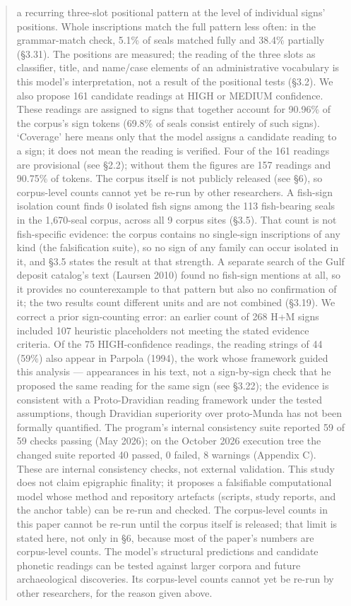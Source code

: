 \documentclass[11pt]{article}
\begin{document}
\begin{abstract}
a recurring three-slot positional pattern at the level of individual signs' positions. Whole inscriptions match the full pattern less often: in the grammar-match check, 5.1\% of seals matched fully and 38.4\% partially (§3.31). The positions are measured; the reading of the three slots as classifier, title, and name/case elements of an administrative vocabulary is this model's interpretation, not a result of the positional tests (§3.2). We also propose 161 candidate readings at HIGH or MEDIUM confidence. These readings are assigned to signs that together account for 90.96\% of the corpus's sign tokens (69.8\% of seals consist entirely of such signs). `Coverage' here means only that the model assigns a candidate reading to a sign; it does not mean the reading is verified. Four of the 161 readings are provisional (see §2.2); without them the figures are 157 readings and 90.75\% of tokens. The corpus itself is not publicly released (see §6), so corpus-level counts cannot yet be re-run by other researchers. A fish-sign isolation count finds 0 isolated fish signs among the 113 fish-bearing seals in the 1,670-seal corpus, across all 9 corpus sites (§3.5). That count is not fish-specific evidence: the corpus contains no single-sign inscriptions of any kind (the falsification suite), so no sign of any family can occur isolated in it, and §3.5 states the result at that strength. A separate search of the Gulf deposit catalog's text (Laursen 2010) found no fish-sign mentions at all, so it provides no counterexample to that pattern but also no confirmation of it; the two results count different units and are not combined (§3.19).
We correct a prior sign-counting error: an earlier count of 268 H+M signs
included 107 heuristic placeholders not meeting the stated evidence
criteria. Of the 75 HIGH-confidence readings, the reading strings of 44 (59\%) also appear in Parpola (1994), the work whose framework guided this analysis --- appearances in his text, not a sign-by-sign check that he proposed the same reading for the same sign (see §3.22); the
evidence is consistent with a Proto-Dravidian reading framework under the
tested assumptions, though Dravidian superiority over proto-Munda has not
been formally quantified. The program's internal consistency suite reported 59 of 59 checks passing (May 2026); on the October 2026 execution tree the changed suite reported 40 passed, 0 failed, 8 warnings (Appendix C). These are internal consistency checks, not external validation. This study does not claim epigraphic finality; it proposes a falsifiable computational model whose method and repository artefacts (scripts, study reports, and the anchor table) can be re-run and checked. The corpus-level counts in this paper cannot be re-run until the corpus itself is released; that limit is stated here, not only in §6, because most of the paper's numbers are corpus-level counts. The model's structural predictions and candidate phonetic readings can be tested against larger corpora and future archaeological discoveries. Its corpus-level counts cannot yet be re-run by other researchers, for the reason given above.
\end{abstract}
\end{document}
